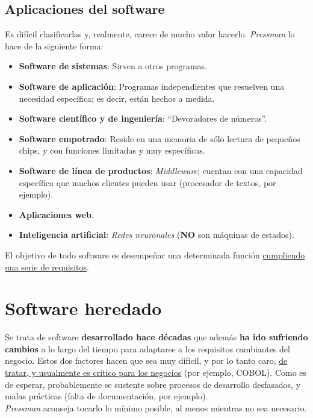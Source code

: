 \subsection{Aplicaciones del software}
Es difícil clasificarlas y, realmente, carece de mucho valor hacerlo. \textit{Pressman} lo hace de la siguiente forma:
\begin{itemize}
    \item \textbf{Software de sistemas}: Sirven a otros programas.
    \item \textbf{Software de aplicación}: Programas independientes que resuelven una necesidad específica; es decir, están hechos a medida.
    \item \textbf{Software científico y de ingeniería}: ``Devoradores de números''.
    \item \textbf{Software empotrado}: Reside en una memoria de sólo lectura de pequeños chips, y con funciones limitadas y muy específicas.
    \item \textbf{Software de línea de productos}: \textit{Middleware}; cuentan con una capacidad específica que muchos clientes pueden usar (procesador de textos, por ejemplo).
    \item \textbf{Aplicaciones web}.
    \item \textbf{Inteligencia artificial}: \textit{Redes neuronales} (\textbf{NO} son máquinas de estados).
\end{itemize}
El objetivo de todo software es desempeñar una determinada función \uline{cumpliendo una serie de requisitos}.

\section{Software heredado}
Se trata de software \textbf{desarrollado hace décadas} %
que además \textbf{ha ido sufriendo cambios} a lo largo del tiempo para adaptarse a los requisitos cambiantes del negocio. Estos dos factores hacen que sea muy difícil, y por lo tanto caro, \uline{de tratar, y usualmente es crítico para los negocios} (por ejemplo, COBOL). Como es de esperar, probablemente se sustente sobre procesos de desarrollo desfasados, y malas prácticas (falta de documentación, por ejemplo).\\

\textit{Pressman} aconseja tocarlo lo mínimo posible, al menos mientras no sea necesario.

